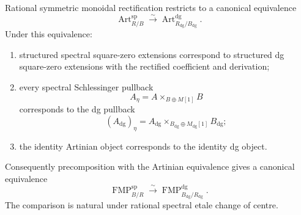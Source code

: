 \begin{theorem}
\label{thm:bnla-rational-artinian-rectification}
Rational symmetric monoidal rectification restricts to a canonical
equivalence
\[
\boxed{
    \operatorname{Art}^{\mathrm{sp}}_{R/B}
    \xrightarrow{\sim}
    \operatorname{Art}^{\mathrm{dg}}_{R_{\mathrm{dg}}/B_{\mathrm{dg}}}.}
\]
Under this equivalence:
\begin{enumerate}
    \item structured spectral square-zero extensions correspond to structured
    dg square-zero extensions with the rectified coefficient and derivation;
    \item every spectral Schlessinger pullback
    \[
    A_\eta=A\times_{B\oplus M[1]}B
    \]
    corresponds to the dg pullback
    \[
    (A_{\mathrm{dg}})_\eta
    =
    A_{\mathrm{dg}}
    \times_{B_{\mathrm{dg}}\oplus M_{\mathrm{dg}}[1]}
    B_{\mathrm{dg}};
    \]
    \item the identity Artinian object corresponds to the identity dg object.
\end{enumerate}
Consequently precomposition with the Artinian equivalence gives a canonical
equivalence
\[
\boxed{
    \operatorname{FMP}^{\mathrm{sp}}_{B/R}
    \xrightarrow{\sim}
    \operatorname{FMP}^{\mathrm{dg}}_{B_{\mathrm{dg}}/R_{\mathrm{dg}}}.}
\]
The comparison is natural under rational spectral etale change of centre.
\end{theorem}

